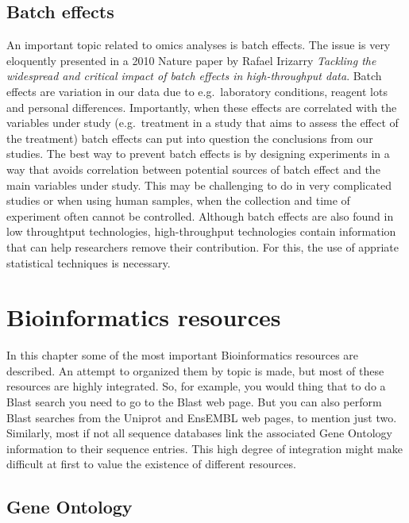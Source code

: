 \documentclass[]{book}
\theoremstyle{definition}
\theoremstyle{definition}
\theoremstyle{definition}
\theoremstyle{remark}
\begin{document}
\section{Batch effects}\label{batch-effects}

An important topic related to omics analyses is batch effects. The issue
is very eloquently presented in a 2010 Nature paper by Rafael Irizarry
\emph{Tackling the widespread and critical impact of batch effects in
high-throughput data}. Batch effects are variation in our data due to
e.g.~laboratory conditions, reagent lots and personal differences.
Importantly, when these effects are correlated with the variables under
study (e.g.~treatment in a study that aims to assess the effect of the
treatment) batch effects can put into question the conclusions from our
studies. The best way to prevent batch effects is by designing
experiments in a way that avoids correlation between potential sources
of batch effect and the main variables under study. This may be
challenging to do in very complicated studies or when using human
samples, when the collection and time of experiment often cannot be
controlled. Although batch effects are also found in low throughtput
technologies, high-throughput technologies contain information that can
help researchers remove their contribution. For this, the use of
appriate statistical techniques is necessary.

\chapter{Bioinformatics resources}\label{bioinformatics-resources}

In this chapter some of the most important Bioinformatics resources are
described. An attempt to organized them by topic is made, but most of
these resources are highly integrated. So, for example, you would thing
that to do a Blast search you need to go to the Blast web page. But you
can also perform Blast searches from the Uniprot and EnsEMBL web pages,
to mention just two. Similarly, most if not all sequence databases link
the associated Gene Ontology information to their sequence entries. This
high degree of integration might make difficult at first to value the
existence of different resources.

\section{Gene Ontology}\label{gene-ontology}
\end{document}
